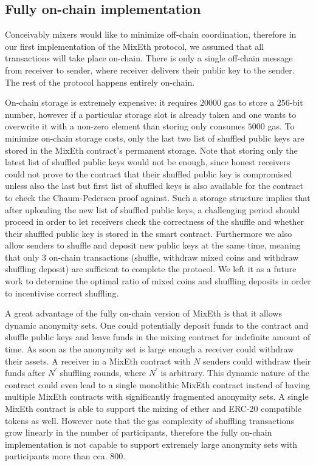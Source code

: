 \documentclass[a4paper]{article}
\theoremstyle{definition}
\begin{document}
\subsection{Fully on-chain implementation} \label{fullyonchainimpl}

Conceivably mixers would like to minimize off-chain coordination, therefore in our first implementation of the MixEth protocol, we assumed that all transactions will take place on-chain. There is only a single off-chain message from receiver to sender, where receiver delivers their public key to the sender. The rest of the protocol happens entirely on-chain.

On-chain storage is extremely expensive: it requires $\num[group-separator={,}]{20000}$ gas to store a $256$-bit number, however if a particular storage slot is already taken and one wants to overwrite it with a non-zero element than storing only consumes $\num[group-separator={,}]{5000}$ gas. To minimize on-chain storage costs, only the last two list of shuffled public keys are stored in the MixEth contract's permanent storage. Note that storing only the latest list of shuffled public keys would not be enough, since honest receivers could not prove to the contract that their shuffled public key is compromised unless also the last but first list of shuffled keys is also available for the contract to check the Chaum-Pedersen proof against. Such a storage structure implies that after uploading the new list of shuffled public keys, a challenging period should proceed in order to let receivers check the correctness of the shuffle and whether their shuffled public key is stored in the smart contract. Furthermore we also allow senders to shuffle and deposit new public keys at the same time, meaning that only $3$ on-chain transactions (shuffle, withdraw mixed coins and withdraw shuffling deposit) are sufficient to complete the protocol. We left it as a future work to determine the optimal ratio of mixed coins and shuffling deposits in order to incentivise correct shuffling.

A great advantage of the fully on-chain version of MixEth is that it allows dynamic anonymity sets. One could potentially deposit funds to the contract and shuffle public keys and leave funds in the mixing contract for indefinite amount of time. As soon as the anonymity set is large enough a receiver could withdraw their assets. A receiver in a MixEth contract with $N$ senders could withdraw their funds after $N^{'}$ shuffling rounds, where $N^{'}$ is arbitrary.  This dynamic nature of the contract could even lead to a single monolithic MixEth contract instead of having multiple MixEth contracts with significantly fragmented anonymity sets. A single MixEth contract is able to support the mixing of ether and ERC-20 compatible tokens as well. However note that the gas complexity of shuffling transactions grow linearly in the number of participants, therefore the fully on-chain implementation is not capable to support extremely large anonymity sets with participants more than cca. $\num[group-separator={,}]{800}$. 
\end{document}
